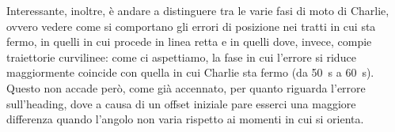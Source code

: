 \vspace{0.5cm}
Interessante, inoltre, è andare a distinguere tra le varie fasi di moto di Charlie, ovvero vedere come si comportano gli errori di posizione nei tratti in cui sta fermo, in quelli in cui procede in linea retta e in quelli dove, invece, compie traiettorie curvilinee: come ci aspettiamo, la fase in cui l'errore si riduce maggiormente coincide con quella in cui Charlie sta fermo (da \SI{50}{\second} a \SI{60}{\second}). 
Questo non accade però, come già accennato, per quanto riguarda l'errore  sull'heading, 
dove a causa di un offset iniziale pare esserci una maggiore differenza quando l'angolo non varia rispetto ai momenti in cui si orienta.







